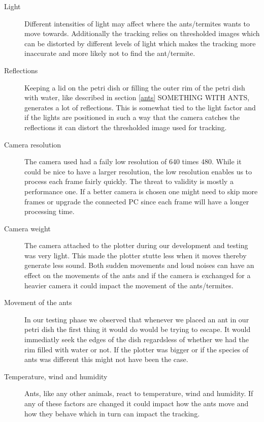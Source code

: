 \begin{description}
\item[Light] Different intensities of light may affect where the ants/termites wants to move towards. Additionally the tracking relies on thresholded images which can be distorted by different levels of light which makes the tracking more inaccurate and more likely not to find the ant/termite. \\

\item[Reflections] Keeping a lid on the petri dish or filling the outer rim of the petri dish with water, like described in section \ref{ants} SOMETHING WITH ANTS, generates a lot of reflections. This is somewhat tied to the light factor and if the lights are positioned in such a way that the camera catches the reflections it can distort the thresholded image used for tracking. \\

\item[Camera resolution] The camera used had a faily low resolution of 640 times 480. While it could be nice to have a larger resolution, the low resolution enables us to process each frame fairly quickly. The threat to validity is mostly a performance one. If a better camera is chosen one might need to skip more frames or upgrade the connected PC since each frame will have a longer processing time. \\

\item[Camera weight] The camera attached to the plotter during our development and testing was very light. This made the plotter stutte less when it moves thereby generate less sound. Both sudden movements and loud noises can have an effect on the movements of the ants and if the camera is exchanged for a heavier camera it could impact the movement of the ants/termites. \\

\item[Movement of the ants] In our testing phase we observed that whenever we placed an ant in our petri dish the first thing it would do would be trying to escape. It would immediatly seek the edges of the dish regardsless of whether we had the rim filled with water or not. If the plotter was bigger or if the species of ants was different this might not have been the case. \\

\item[Temperature, wind and humidity] Ants, like any other animals, react to temperature, wind and humidity. If any of these factors are changed it could impact how the ants move and how they behave which in turn can impact the tracking. \\  


\end{description}
